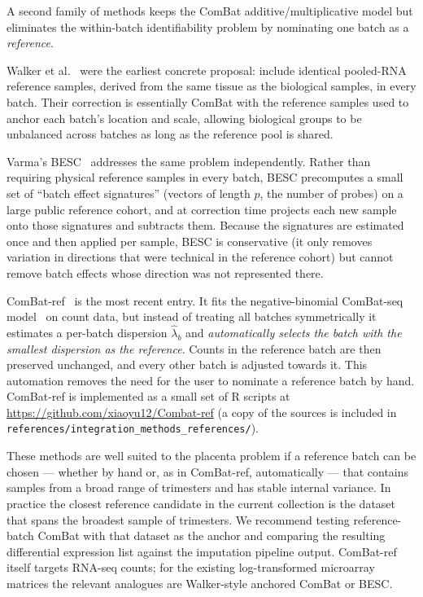 \documentclass[11pt,a4paper]{article}
\begin{document}
A second family of methods keeps the ComBat additive/multiplicative
model but eliminates the within-batch identifiability problem by
nominating one batch as a \emph{reference}.

Walker et al.~\cite{walker2008} were the earliest concrete proposal:
include identical pooled-RNA reference samples, derived from the
same tissue as the biological samples, in every batch. Their
correction is essentially ComBat with the reference samples used
to anchor each batch's location and scale, allowing biological
groups to be unbalanced across batches as long as the reference
pool is shared.

Varma's BESC~\cite{varma2020} addresses the same problem
independently. Rather than requiring physical reference samples in
every batch, BESC precomputes a small set of ``batch effect
signatures'' (vectors of length \(p\), the number of probes) on a
large public reference cohort, and at correction time projects
each new sample onto those signatures and subtracts them. Because
the signatures are estimated once and then applied per sample,
BESC is conservative (it only removes variation in directions that
were technical in the reference cohort) but cannot remove batch
effects whose direction was not represented there.

ComBat-ref~\cite{zhang2025} is the most recent entry. It fits the
negative-binomial ComBat-seq model~\cite{zhang2020} on count data, but instead of
treating all batches symmetrically it estimates a per-batch
dispersion \(\hat{\lambda}_b\) and \emph{automatically selects the
batch with the smallest dispersion as the reference}. Counts in
the reference batch are then preserved unchanged, and every other
batch is adjusted towards it. This automation removes the need for
the user to nominate a reference batch by hand. ComBat-ref is
implemented as a small set of R scripts at
\url{https://github.com/xiaoyu12/Combat-ref} (a copy of the
sources is included in
\texttt{references/integration\_methods\_references/}).

These methods are well suited to the placenta problem if a
reference batch can be chosen --- whether by hand or, as in
ComBat-ref, automatically --- that contains samples from a broad
range of trimesters and has stable internal variance. In practice
the closest reference candidate in the current collection is the
dataset that spans the broadest sample of trimesters. We recommend
testing reference-batch ComBat with that dataset as the anchor and
comparing the resulting differential expression list against the
imputation pipeline output. ComBat-ref itself targets RNA-seq
counts; for the existing log-transformed microarray matrices the
relevant analogues are Walker-style anchored ComBat or BESC.
\end{document}
